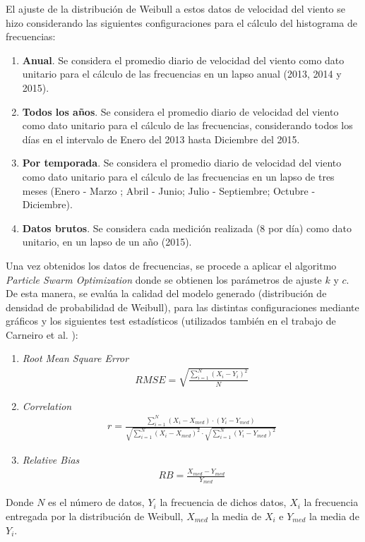 El ajuste de la distribución de Weibull a estos datos de velocidad del viento se hizo considerando las siguientes configuraciones para el cálculo del
histograma de frecuencias:
\begin{enumerate}
\item \textbf{Anual}. Se considera el promedio diario de velocidad del viento como dato unitario para el cálculo de las frecuencias en
  un lapso anual (2013, 2014 y 2015).
  \item \textbf{Todos los años}. Se considera el promedio diario de velocidad del viento como dato unitario para el cálculo de las frecuencias, considerando
  todos los días en el intervalo de Enero del 2013 hasta Diciembre del 2015.
  \item \textbf{Por temporada}. Se considera el promedio diario de velocidad del viento como dato unitario para el cálculo de las frecuencias en
  un lapso de tres meses (Enero - Marzo ; Abril - Junio; Julio - Septiembre; Octubre - Diciembre).
  \item \textbf{Datos brutos}. Se considera cada medición realizada (8 por día) como dato unitario, en un lapso de un año (2015).
\end{enumerate}

Una vez obtenidos los datos de frecuencias, se procede a aplicar el algoritmo \emph{Particle Swarm Optimization} donde se obtienen los parámetros de ajuste $k$ y $c$. De esta manera, se evalúa la calidad del modelo generado (distribución de densidad de probabilidad de Weibull), para las distintas configuraciones mediante gráficos y los siguientes test estadísticos (utilizados también en el trabajo de Carneiro et al. \cite{Carneiro15}):
\begin{enumerate}
    \item \emph{Root Mean Square Error}
        \begin{align}
            RMSE = \sqrt{\frac{\sum_{i=1}^{N}(X_i - Y_i)^2}{N}}
        \end{align}    
    \item \emph{Correlation}
        \begin{align}
            r = \frac{\sum_{i=1}^{N}(X_i - X_{med})\cdot(Y_i - Y_{med})}{\sqrt{\sum_{i=1}^{N}(X_i - X_{med})^2}\cdot\sqrt{\sum_{i=1}^{N}(Y_i - Y_{med})^2}}
        \end{align}    
    \item \emph{Relative Bias}
        \begin{align}
            RB = \frac{X_{med} - Y_{med}}{Y_{med}}  
        \end{align}    
\end{enumerate}        
Donde $N$ es el número de datos, $Y_i$ la frecuencia de dichos datos, $X_i$ la frecuencia entregada por la distribución de Weibull, $X_{med}$ la media de $X_i$ e $Y_{med}$ la media de $Y_i$. \\

